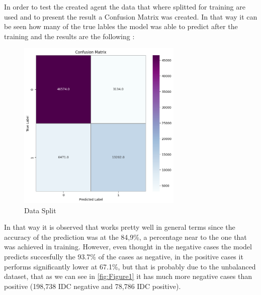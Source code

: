 In order to test the created agent the data that where splitted for training are used and to present the result a Confusion Matrix was created. In that way it can be seen how many of the true lables the model was able to predict after the training and the results are the following :
\begin{figure}[H]
    \centering
    \includegraphics[width=0.7\textwidth]{Images/confusion.png}
    \caption{Data Split}
    \label{fig:example}
\end{figure}
In that way it is observed that works pretty well in general terms since the accuracy of the prediction was at the 84,9\%, a percentage near to the one that was achieved in training. However, even thought in the negative cases the model predicts succesfully the 93.7\% of the cases as negative, in the positive cases it performs significantly lower at 67.1\%, but that is probably due to the unbalanced dataset, that as we can see in \autoref{fig:Figure1} it has much more negative cases than positive (198,738 IDC negative and 78,786 IDC positive).